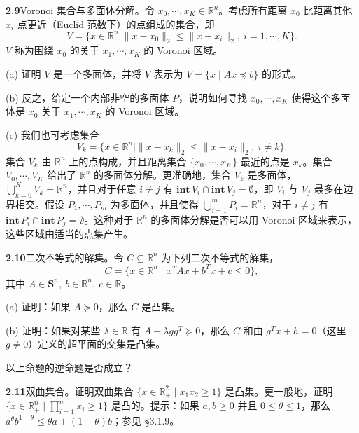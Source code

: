 \documentclass[UTF8, 12pt, fontset=fandol, oneside]{ctexart}
\begin{document}
\noindent\textbf{2.9}\quad Voronoi 集合与多面体分解。令 $x_0,\cdots,x_K\in\mathbb{R}^n$。考虑所有距离 $x_0$ 比距离其他 $x_i$ 点更近（Euclid 范数下）的点组成的集合，即
\[
  V=\{x\in\mathbb{R}^n\mid \|x-x_0\|_2\le\|x-x_i\|_2,\ i=1,\cdots,K\}.
\]
$V$ 称为围绕 $x_0$ 的关于 $x_1,\cdots,x_K$ 的 Voronoi 区域。

\noindent(a) 证明 $V$ 是一个多面体，并将 $V$ 表示为 $V=\{x\mid Ax\preceq b\}$ 的形式。

\noindent(b) 反之，给定一个内部非空的多面体 $P$，说明如何寻找 $x_0,\cdots,x_K$ 使得这个多面体是 $x_0$ 关于 $x_1,\cdots,x_K$ 的 Voronoi 区域。

\noindent(c) 我们也可考虑集合
\[
  V_k=\{x\in\mathbb{R}^n\mid \|x-x_k\|_2\le\|x-x_i\|_2,\ i\ne k\}.
\]
集合 $V_k$ 由 $\mathbb{R}^n$ 上的点构成，并且距离集合 $\{x_0,\cdots,x_K\}$ 最近的点是 $x_k$。集合 $V_0,\cdots,V_K$ 给出了 $\mathbb{R}^n$ 的多面体分解。更准确地，集合 $V_k$ 是多面体，$\bigcup_{k=0}^K V_k=\mathbb{R}^n$，并且对于任意 $i\ne j$ 有 $\mathbf{int}\,V_i\cap\mathbf{int}\,V_j=\emptyset$，即 $V_i$ 与 $V_j$ 最多在边界相交。假设 $P_1,\cdots,P_m$ 为多面体，并且使得 $\bigcup_{i=1}^m P_i=\mathbb{R}^n$，对于 $i\ne j$ 有 $\mathbf{int}\,P_i\cap\mathbf{int}\,P_j=\emptyset$。这种对于 $\mathbb{R}^n$ 的多面体分解是否可以用 Voronoi 区域来表示，这些区域由适当的点集产生。

\noindent\textbf{2.10}\quad 二次不等式的解集。令 $C\subseteq\mathbb{R}^n$ 为下列二次不等式的解集，
\[
  C=\{x\in\mathbb{R}^n\mid x^TAx+b^Tx+c\le0\},
\]
其中 $A\in\mathbf{S}^n,\ b\in\mathbb{R}^n,\ c\in\mathbb{R}$。

\noindent(a) 证明：如果 $A\succeq0$，那么 $C$ 是凸集。

\noindent(b) 证明：如果对某些 $\lambda\in\mathbb{R}$ 有 $A+\lambda gg^T\succeq0$，那么 $C$ 和由 $g^Tx+h=0$（这里 $g\ne0$）定义的超平面的交集是凸集。

以上命题的逆命题是否成立？

\noindent\textbf{2.11}\quad 双曲集合。证明双曲集合 $\{x\in\mathbb{R}_+^2\mid x_1x_2\ge1\}$ 是凸集。更一般地，证明 $\{x\in\mathbb{R}_+^n\mid \prod_{i=1}^n x_i\ge1\}$ 是凸的。提示：如果 $a,b\ge0$ 并且 $0\le\theta\le1$，那么 $a^\theta b^{1-\theta}\le\theta a+(1-\theta)b$；参见 \S3.1.9。
\end{document}
